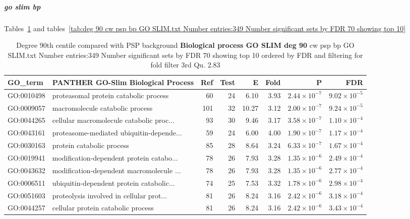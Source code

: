 \subparagraph{go slim bp}

Tables~\ref{tab:deg 90 cw psp bp GO SLIM.txt Number entries:349 Number significant sets by FDR 70 showing top 10 ordered by FDR and filtering for fold filter 3rd Qu. 2.83} and tables~\ref{tab:deg 90 cw psp bp GO SLIM.txt Number entries:349 Number significant sets by FDR 70 showing top 10}


\begin{table}[ht]
\centering
\begin{adjustbox}{width=\textwidth}

\begin{tabular}{llrrrrrr}
  \hline
GO\_term & PANTHER \textbf{GO-Slim Biological Process} & Ref & Test & E & Fold & P & FDR \\ 
  \hline
GO:0010498 & proteasomal protein catabolic process  & 60 & 24 & 6.10 & 3.93 & $2.44 \times 10^{-7}$ & $9.02 \times 10^{-5}$ \\ 
  GO:0009057 & macromolecule catabolic process  & 101 & 32 & 10.27 & 3.12 & $2.00 \times 10^{-7}$ & $9.24 \times 10^{-5}$ \\ 
  GO:0044265 & cellular macromolecule catabolic proc... & 93 & 30 & 9.46 & 3.17 & $3.58 \times 10^{-7}$ & $1.10 \times 10^{-4}$ \\ 
  GO:0043161 & proteasome-mediated ubiquitin-depende... & 59 & 24 & 6.00 & 4.00 & $1.90 \times 10^{-7}$ & $1.17 \times 10^{-4}$ \\ 
  GO:0030163 & protein catabolic process  & 85 & 28 & 8.64 & 3.24 & $6.33 \times 10^{-7}$ & $1.67 \times 10^{-4}$ \\ 
  GO:0019941 & modification-dependent protein catabo... & 78 & 26 & 7.93 & 3.28 & $1.35 \times 10^{-6}$ & $2.49 \times 10^{-4}$ \\ 
  GO:0043632 & modification-dependent macromolecule ... & 78 & 26 & 7.93 & 3.28 & $1.35 \times 10^{-6}$ & $2.77 \times 10^{-4}$ \\ 
  GO:0006511 & ubiquitin-dependent protein catabolic... & 74 & 25 & 7.53 & 3.32 & $1.78 \times 10^{-6}$ & $2.98 \times 10^{-4}$ \\ 
  GO:0051603 & proteolysis involved in cellular prot... & 81 & 26 & 8.24 & 3.16 & $2.42 \times 10^{-6}$ & $3.18 \times 10^{-4}$ \\ 
  GO:0044257 & cellular protein catabolic process  & 81 & 26 & 8.24 & 3.16 & $2.42 \times 10^{-6}$ & $3.43 \times 10^{-4}$ \\ 
  \hline
\end{tabular}
\end{adjustbox}
\caption{Degree 90th centile compared with PSP background \textbf{Biological process GO SLIM deg 90} cw psp bp GO SLIM.txt Number entries:349 Number significant sets by FDR 70 showing top 10 ordered by FDR and filtering for fold filter 3rd Qu. 2.83} 
\label{tab:deg 90 cw psp bp GO SLIM.txt Number entries:349 Number significant sets by FDR 70 showing top 10 ordered by FDR and filtering for fold filter 3rd Qu. 2.83}
\end{table}



